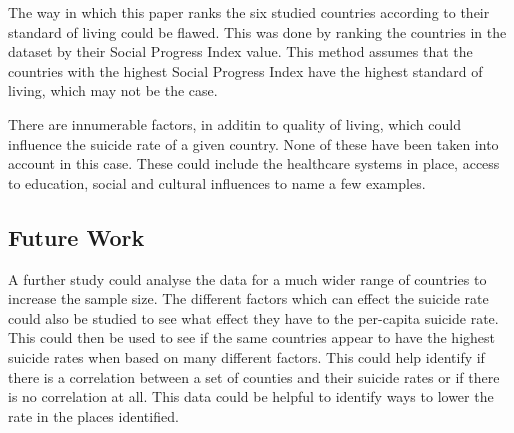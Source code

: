 \documentclass[conference]{IEEEtran}
\begin{document}
The way in which this paper ranks the six studied countries according to their standard of living could be flawed.
This was done by ranking the countries in the dataset by their Social Progress Index value. 
This method assumes that the countries with the highest Social Progress Index have the highest standard of living, which may not be the case.

There are innumerable factors, in additin to quality of living, which could influence the suicide rate of a given country.
None of these have been taken into account in this case. These could include the healthcare systems in place, access to education, social and cultural influences to name a few examples.

\subsection{Future Work}
A further study could analyse the data for a much wider range of countries to increase the sample size.
The different factors which can effect the suicide rate could also be studied to see what effect they have to the per-capita suicide rate.
This could then be used to see if the same countries appear to have the highest suicide rates when based on many different factors.
This could help identify if there is a correlation between a set of counties and their suicide rates or if there is no correlation at all.
This data could be helpful to identify ways to lower the rate in the places identified. 
\end{document}
